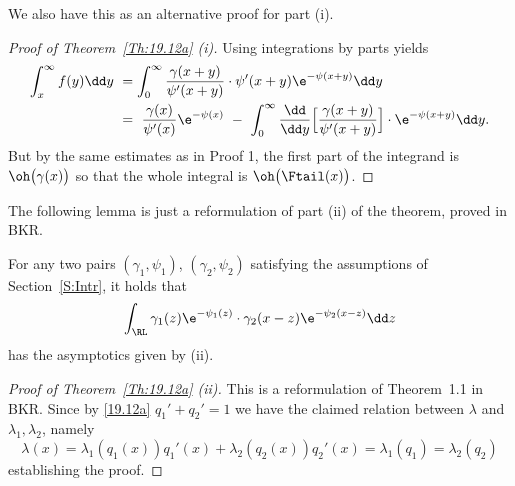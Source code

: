 \begin{subappendices}
We also have this as an alternative proof for part (i).

\begin{proof}[Proof of Theorem~{\ref{Th:19.12a}} {\rm (i)}]
Using integrations by parts yields
\begin{align*}\int_x^\infty f(y)\dd y\ &= \int_0^\infty  \frac{\gamma(x+y)}{\psi'(x+y)}
\cdot \psi'(x+y)\e^{-\psi(x+y)} \dd y  \\ &=\
 \frac{\gamma(x)}{\psi'(x)}\e^{-\psi(x)}\ -\  \int_0^\infty  \frac{\dd}{\dd y}\Bigl[\frac{\gamma(x+y)}{\psi'(x+y)}\Bigr]
\cdot \e^{-\psi(x+y)} \dd y.
\end{align*}
But by the same estimates as in Proof 1, the first part of the integrand is $\oh\bigl(\gamma(x)\bigr)$
so that the whole integral is $\oh\bigl(\Ftail(x)\bigr)$.
\end{proof}

The following lemma is just a reformulation of part (ii) of the theorem, proved in BKR.
\begin{lemma}\label{Lemma:19.12a} For any two pairs $(\gamma_1,\psi_1)$, $(\gamma_2,\psi_2)$
satisfying the assumptions of Section~\ref{S:Intr}, it holds that
\begin{equation*}
	\int_{\RL}  \gamma_1(z)\e^{-\psi_1(z)}\cdot \gamma_2(x-z)\e^{-\psi_2(x-z)}\dd z
\end{equation*}
has the asymptotics given by (ii).
\end{lemma}

\begin{proof}[Proof of Theorem~{\ref{Th:19.12a}} {\rm (ii)}]
This is a reformulation of Theorem~1.1 in BKR.
Since by \eqref{19.12a} $q_1'+q_2'=1$ we have the claimed relation between $\lambda$ and
$\lambda_1,\lambda_2$, namely
\begin{equation} \label{remm}
 \lambda(x) = \lambda_1(q_1(x))q_1'(x) + \lambda_2(q_2(x))q_2'(x) = \lambda_1(q_1) = \lambda_2(q_2)
\end{equation}
establishing the proof.
\end{proof}


\end{subappendices}
